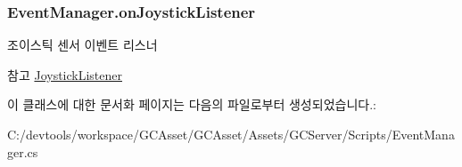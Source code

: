 \subsubsection[{on\+Joystick\+Listener}]{ Event\+Manager.\+on\+Joystick\+Listener}\label{class_event_manager_ab148217093b03a8cd7c962a11195c83a}
조이스틱 센서 이벤트 리스너 \begin{DoxySeeAlso}{참고}
\hyperlink{class_event_manager_ad470a4c2e411d814dd480043332f2a70}{Joystick\+Listener} 
\end{DoxySeeAlso}


이 클래스에 대한 문서화 페이지는 다음의 파일로부터 생성되었습니다.\+:\begin{DoxyCompactItemize}
\item 
C\+:/devtools/workspace/\+G\+C\+Asset/\+G\+C\+Asset/\+Assets/\+G\+C\+Server/\+Scripts/Event\+Manager.\+cs\end{DoxyCompactItemize}
